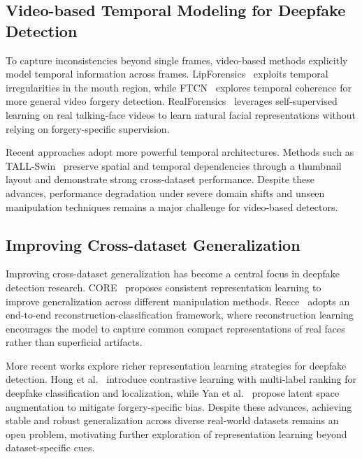 \documentclass[runningheads]{llncs}
\begin{document}
\subsection{Video-based Temporal Modeling for Deepfake Detection}

To capture inconsistencies beyond single frames, video-based methods explicitly model temporal information across frames. LipForensics~\cite{haliassos2021lips} exploits temporal irregularities in the mouth region, while FTCN~\cite{zheng2021exploring} explores temporal coherence for more general video forgery detection. RealForensics~\cite{haliassos2022leveraging} leverages self-supervised learning on real talking-face videos to learn natural facial representations without relying on forgery-specific supervision.

Recent approaches adopt more powerful temporal architectures. Methods such as TALL-Swin~\cite{xu2023tall} preserve spatial and temporal dependencies through a thumbnail layout and demonstrate strong cross-dataset performance. Despite these advances, performance degradation under severe domain shifts and unseen manipulation techniques remains a major challenge for video-based detectors.

\subsection{Improving Cross-dataset Generalization}

Improving cross-dataset generalization has become a central focus in deepfake detection research. CORE~\cite{ni2022core} proposes consistent representation learning to improve generalization across different manipulation methods. Recce~\cite{cao2022end} adopts an end-to-end reconstruction-classification framework, where reconstruction learning encourages the model to capture common compact representations of real faces rather than superficial artifacts.


More recent works explore richer representation learning strategies for deepfake detection. Hong et al.~\cite{hong2024contrastive} introduce contrastive learning with multi-label ranking for deepfake classification and localization, while Yan et al.~\cite{yan2024transcending} propose latent space augmentation to mitigate forgery-specific bias. Despite these advances, achieving stable and robust generalization across diverse real-world datasets remains an open problem, motivating further exploration of representation learning beyond dataset-specific cues.
\end{document}

